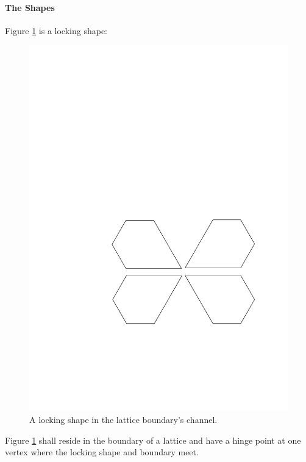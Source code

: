 \paragraph{The Shapes}
Figure \ref{fig:lockingShape} is a locking shape:
\begin{figure}[h]
\begin{center}
\includegraphics{graphics/shapeInChannel.pdf}
\end{center} 
\caption{A locking shape in the lattice boundary's channel.}
\label{fig:lockingShape}
\end{figure}
Figure \ref{fig:lockingShape} shall reside in the boundary of a lattice and have
a hinge point at one vertex where the locking shape and boundary meet.

